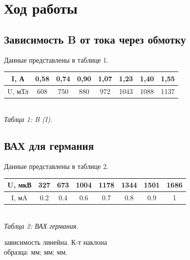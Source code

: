 

\section{Ход работы}

\subsection{Зависимость B от тока через обмотку}

Данные представлены в таблице 1.

\begin{table}[h!] %
    \begin{center}
    \begin{tabular}{|c|c|c|c|c|c|c|c|}
    \hline
    I, А   & 0,58 & 0,74 & 0,90 & 1,07 & 1,23 & 1,40 & 1,55 \\ \hline
    U, мТл & 608  & 750  & 880  & 972  & 1043 & 1088 & 1137 \\ \hline
    \end{tabular} \\ [0.2cm]
    \textit {Таблца 1: B (I).}
    \end{center}
\end{table}

\subsection{ВАХ для германия}

Данные представлены в таблице 2.

\begin{table}[h!] %
    \begin{center}
    \begin{tabular}{|c|c|c|c|c|c|c|c|}
    \hline
    U, мкВ  & 327 & 673 & 1004 & 1178 & 1344 & 1501 & 1686 \\ \hline
    I, мA   & 0.2 & 0.4 & 0.6  & 0.7  & 0.8  & 0.9  & 1 \\ \hline
    \end{tabular} \\ [0.2cm]
    \textit {Таблца 2: ВАХ германия.}
    \end{center}
\end{table}

 зависимость линейна. К-т наклона  \\

 образца:  мм;  мм;  мм. \\

